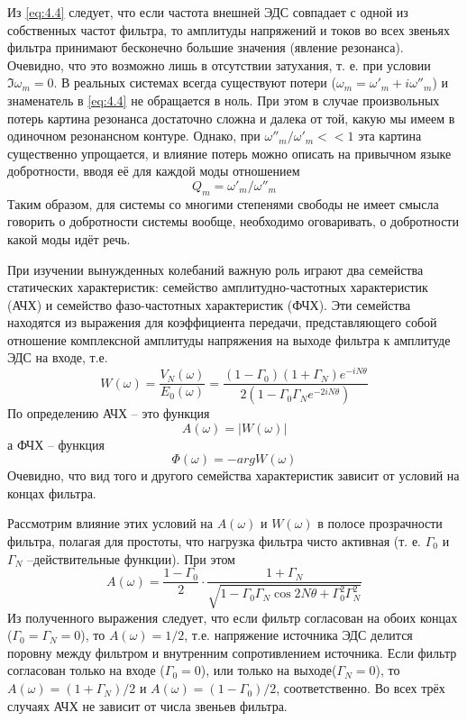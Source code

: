 Из \eqref{eq:4.4} следует, что если частота внешней ЭДС совпадает с одной из собственных частот фильтра, то амплитуды напряжений и токов во всех звеньях фильтра принимают бесконечно большие значения (явление резонанса). Очевидно, что это возможно лишь в отсутствии затухания, т. е. при условии $\Im\omega_m=0$. В реальных системах всегда существуют потери ($\omega_m=\omega'_m+i\omega''_m$) и знаменатель в \eqref{eq:4.4} не обращается в ноль. При этом в случае произвольных потерь картина резонанса достаточно сложна и далека от той, какую мы имеем в одиночном резонансном контуре. Однако, при $\omega''_m/\omega'_m<<1$ эта картина существенно упрощается, и влияние потерь можно описать на привычном языке добротности, вводя её для каждой моды отношением
\begin{equation}
\label{eq:4.5}
Q_m=\omega'_m/\omega''_m
\end{equation}
Таким образом, для системы со многими степенями свободы не имеет смысла говорить о добротности системы вообще, необходимо оговаривать, о добротности какой моды идёт речь.

При изучении вынужденных колебаний важную роль играют два семейства статических характеристик: семейство амплитудно-частотных характеристик (АЧХ) и семейство фазо-частотных характеристик (ФЧХ). Эти семейства находятся из выражения для коэффициента передачи, представляющего собой отношение комплексной амплитуды напряжения на выходе фильтра к амплитуде ЭДС на входе, т.е.
\begin{equation}
\label{eq:4.6}
W(\omega)=\frac{V_N(\omega)}{E_0(\omega)}=\frac{(1-\Gamma_0)(1+\Gamma_N)e^{-iN\theta}}{2\left(1-\Gamma_0\Gamma_Ne^{-2iN\theta}\right)}
\end{equation}
По определению АЧХ -- это функция 
\begin{equation}
\label{eq:4.7}
A(\omega)=|W(\omega)|
\end{equation}
а ФЧХ -- функция
\begin{equation}
\label{eq:4.8}
\Phi(\omega)=-argW(\omega)
\end{equation}
Очевидно, что вид того и другого семейства характеристик зависит от условий на концах фильтра.

Рассмотрим влияние этих условий на $A(\omega)$ и $W(\omega)$ в полосе прозрачности фильтра, полагая для простоты, что нагрузка фильтра чисто активная (т. е. $\Gamma_0$ и $\Gamma_N$ –действительные функции). При этом
\begin{equation}
\label{eq:4.9}
A(\omega)=\frac{1-\Gamma_0}{2}\cdot\frac{1+\Gamma_N}
{\sqrt{1-\Gamma_0\Gamma_N\cos2N\theta+\Gamma^2_0\Gamma^2_N}}
\end{equation}
Из полученного выражения следует, что если фильтр согласован на обоих концах ($\Gamma_0=\Gamma_N=0$), то $A(\omega)=1/2$, т.е. напряжение источника ЭДС делится поровну между фильтром и внутренним сопротивлением источника. Если фильтр согласован только на входе ($\Gamma_0=0$), или только на выходе($\Gamma_N=0$), то $A(\omega)=(1+\Gamma_N)/2$ и $A(\omega)=(1-\Gamma_0)/2$, соответственно. Во всех трёх случаях АЧХ не зависит от числа звеньев фильтра.
 
